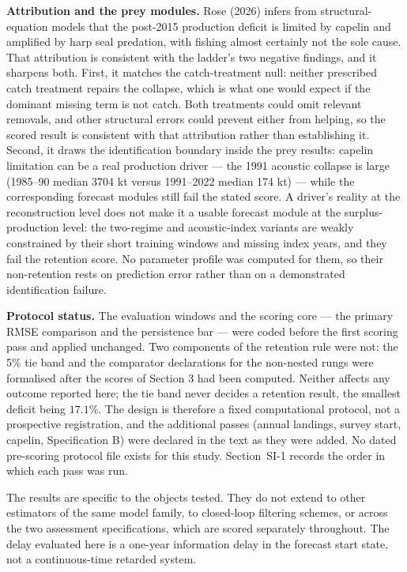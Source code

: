 \documentclass[11pt]{article}
\begin{document}
\textbf{Attribution and the prey modules.} Rose (2026) infers from
structural-equation models that the post-2015 production deficit is
limited by capelin and amplified by harp seal predation, with fishing
almost certainly not the sole cause. That attribution is consistent with
the ladder's two negative findings, and it sharpens both. First, it
matches the catch-treatment null: neither prescribed catch treatment
repairs the collapse, which is what one would expect if the dominant
missing term is not catch. Both treatments could omit relevant
removals, and other structural errors could prevent either from helping,
so the scored result is consistent with that attribution rather than
establishing it. Second, it draws the
identification boundary inside the prey results: capelin limitation can
be a real production driver --- the 1991 acoustic collapse is large
(1985--90 median 3704 kt versus 1991--2022 median 174 kt) --- while the
corresponding forecast modules still fail the stated score. A driver's
reality at the reconstruction level does not make it a usable forecast
module at the surplus-production level: the two-regime and
acoustic-index variants are weakly constrained by their short training
windows and missing index years, and they fail the retention score. No
parameter profile was computed for them, so their non-retention rests
on prediction error rather than on a demonstrated identification
failure.

\textbf{Protocol status.} The evaluation windows and the scoring core
--- the primary RMSE comparison and the persistence bar --- were coded
before the first scoring pass and applied unchanged. Two components of
the retention rule were not: the 5\% tie band and the comparator
declarations for the non-nested rungs were formalised after the scores
of Section 3 had been computed. Neither affects any outcome reported
here; the tie band never decides a retention result, the smallest deficit
being \(17.1\%\). The design is therefore a fixed computational
protocol, not a prospective registration, and the additional passes
(annual landings, survey start, capelin, Specification B) were declared
in the text as they were added. No dated pre-scoring protocol file exists for this study.
Section~SI-1 records the order in which each pass was run.

The results are specific to the objects tested. They do not extend to
other estimators of the same model family, to closed-loop filtering
schemes, or across the two assessment specifications, which are scored
separately throughout. The delay evaluated here is a one-year
information delay in the forecast start state, not a continuous-time
retarded system.
\end{document}
